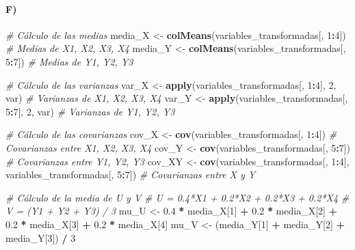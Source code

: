 \documentclass[
]{article}
\newenvironment{Shaded}{\begin{snugshade}}{\end{snugshade}}
\newcommand{\CommentTok}[1]{\textcolor[rgb]{0.56,0.35,0.01}{\textit{#1}}}
\newcommand{\DecValTok}[1]{\textcolor[rgb]{0.00,0.00,0.81}{#1}}
\newcommand{\FloatTok}[1]{\textcolor[rgb]{0.00,0.00,0.81}{#1}}
\newcommand{\FunctionTok}[1]{\textcolor[rgb]{0.13,0.29,0.53}{\textbf{#1}}}
\newcommand{\NormalTok}[1]{#1}
\newcommand{\OtherTok}[1]{\textcolor[rgb]{0.56,0.35,0.01}{#1}}
\newcommand{\SpecialCharTok}[1]{\textcolor[rgb]{0.81,0.36,0.00}{\textbf{#1}}}
\begin{document}
\hypertarget{f-2}{%
\paragraph{F)}\label{f-2}}

\begin{Shaded}
\begin{Highlighting}[]
\CommentTok{\# Cálculo de las medias}
\NormalTok{media\_X }\OtherTok{\textless{}{-}} \FunctionTok{colMeans}\NormalTok{(variables\_transformadas[, }\DecValTok{1}\SpecialCharTok{:}\DecValTok{4}\NormalTok{])  }\CommentTok{\# Medias de X1, X2, X3, X4}
\NormalTok{media\_Y }\OtherTok{\textless{}{-}} \FunctionTok{colMeans}\NormalTok{(variables\_transformadas[, }\DecValTok{5}\SpecialCharTok{:}\DecValTok{7}\NormalTok{])  }\CommentTok{\# Medias de Y1, Y2, Y3}

\CommentTok{\# Cálculo de las varianzas}
\NormalTok{var\_X }\OtherTok{\textless{}{-}} \FunctionTok{apply}\NormalTok{(variables\_transformadas[, }\DecValTok{1}\SpecialCharTok{:}\DecValTok{4}\NormalTok{], }\DecValTok{2}\NormalTok{, var)  }\CommentTok{\# Varianzas de X1, X2, X3, X4}
\NormalTok{var\_Y }\OtherTok{\textless{}{-}} \FunctionTok{apply}\NormalTok{(variables\_transformadas[, }\DecValTok{5}\SpecialCharTok{:}\DecValTok{7}\NormalTok{], }\DecValTok{2}\NormalTok{, var)  }\CommentTok{\# Varianzas de Y1, Y2, Y3}

\CommentTok{\# Cálculo de las covarianzas}
\NormalTok{cov\_X }\OtherTok{\textless{}{-}} \FunctionTok{cov}\NormalTok{(variables\_transformadas[, }\DecValTok{1}\SpecialCharTok{:}\DecValTok{4}\NormalTok{])  }\CommentTok{\# Covarianzas entre X1, X2, X3, X4}
\NormalTok{cov\_Y }\OtherTok{\textless{}{-}} \FunctionTok{cov}\NormalTok{(variables\_transformadas[, }\DecValTok{5}\SpecialCharTok{:}\DecValTok{7}\NormalTok{])  }\CommentTok{\# Covarianzas entre Y1, Y2, Y3}
\NormalTok{cov\_XY }\OtherTok{\textless{}{-}} \FunctionTok{cov}\NormalTok{(variables\_transformadas[, }\DecValTok{1}\SpecialCharTok{:}\DecValTok{4}\NormalTok{], variables\_transformadas[, }\DecValTok{5}\SpecialCharTok{:}\DecValTok{7}\NormalTok{])  }\CommentTok{\# Covarianzas entre X y Y}

\CommentTok{\# Cálculo de la media de U y V}
\CommentTok{\# U = 0.4*X1 + 0.2*X2 + 0.2*X3 + 0.2*X4}
\CommentTok{\# V = (Y1 + Y2 + Y3) / 3}
\NormalTok{mu\_U }\OtherTok{\textless{}{-}} \FloatTok{0.4} \SpecialCharTok{*}\NormalTok{ media\_X[}\DecValTok{1}\NormalTok{] }\SpecialCharTok{+} \FloatTok{0.2} \SpecialCharTok{*}\NormalTok{ media\_X[}\DecValTok{2}\NormalTok{] }\SpecialCharTok{+} \FloatTok{0.2} \SpecialCharTok{*}\NormalTok{ media\_X[}\DecValTok{3}\NormalTok{] }\SpecialCharTok{+} \FloatTok{0.2} \SpecialCharTok{*}\NormalTok{ media\_X[}\DecValTok{4}\NormalTok{]}
\NormalTok{mu\_V }\OtherTok{\textless{}{-}}\NormalTok{ (media\_Y[}\DecValTok{1}\NormalTok{] }\SpecialCharTok{+}\NormalTok{ media\_Y[}\DecValTok{2}\NormalTok{] }\SpecialCharTok{+}\NormalTok{ media\_Y[}\DecValTok{3}\NormalTok{]) }\SpecialCharTok{/} \DecValTok{3}


\end{Highlighting}
\end{Shaded}
\end{document}
